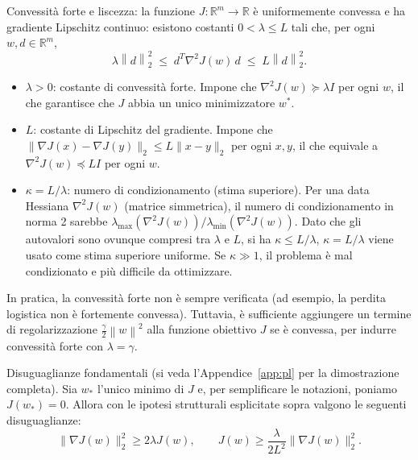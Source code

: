 \documentclass[italian, a4paper, twoside, binding=6mm]{sapthesis}
\newcommand{\R}{\mathbb{R}}
\newcommand{\norm}[1]{\left\|#1\right\|}
\begin{document}
\begin{definitionbox}
  Convessit\`a forte e liscezza: la funzione $J: \R^m \to \R$ \`e uniformemente convessa e ha gradiente Lipschitz continuo: esistono costanti $0 < \lambda \leq L$ tali che, per ogni $w, d \in \R^m$,
  \[
    \lambda \norm{d}_2^2 \;\leq\; d^T \nabla^2 J(w)\, d \;\leq\; L \norm{d}_2^2.
  \]
  \begin{itemize}
    \item $\lambda > 0$: costante di convessità forte. Impone che $\nabla^2 J(w) \succeq \lambda I$ per ogni $w$, il che garantisce che $J$ abbia un unico minimizzatore $w^*$.
    \item $L$: costante di Lipschitz del gradiente. Impone che $\|\nabla J(x) - \nabla J(y)\|_2 \leq L\|x - y\|_2$ per ogni $x,y$, il che equivale a $\nabla^2 J(w) \preceq LI$ per ogni $w$.
    \item $\kappa = L/\lambda$: numero di condizionamento (stima superiore). Per una data Hessiana $\nabla^2 J(w)$ (matrice simmetrica), il numero di condizionamento in norma 2 sarebbe $\lambda_{\max}(\nabla^2 J(w))/\lambda_{\min}(\nabla^2 J(w))$. Dato che gli autovalori sono ovunque compresi tra $\lambda$ e $L$, si ha $\kappa \leq L/\lambda$, $\kappa = L/\lambda$ viene usato come stima superiore uniforme. Se $\kappa \gg 1$, il problema è mal condizionato e più difficile da ottimizzare.
\end{itemize}
  

  
\end{definitionbox}

\begin{notebox}
  In pratica, la convessit\`a forte non \`e sempre verificata (ad esempio, la perdita logistica non \`e fortemente convessa). Tuttavia, \`e sufficiente aggiungere un termine di regolarizzazione $\frac{\gamma}{2}\norm{w}^2$ alla funzione obiettivo $J$ se è convessa, per indurre convessit\`a forte con $\lambda = \gamma$.
\end{notebox}
\begin{notebox}
  Disuguaglianze fondamentali (si veda l'Appendice~\ref{app:pl} per la dimostrazione completa).
  Sia $w_*$ l'unico minimo di $J$ e, per semplificare le notazioni, poniamo $J(w_*) = 0$. Allora con le ipotesi strutturali esplicitate sopra valgono le seguenti disuguaglianze:
  \[
  \|\nabla J(w)\|_2^2 \geq 2\lambda J(w), \qquad J(w) \geq \frac{\lambda}{2L^2} \|\nabla J(w)\|_2^2.
  \]
\end{notebox}
\newpage
\end{document}
